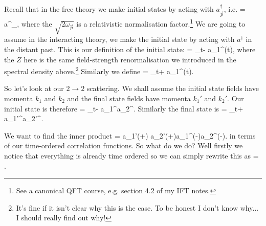 Recall that in the free theory we make initial states by acting with $a^{\dagger}_{\vec{p}}$, i.e. 
\bse 
     =  \, a^{\dagger}_{},
\ese
where the $\sqrt{2\omega_{\vec{p}}}$ is a relativistic normalisation factor.\footnote{See a canonical QFT course, e.g. section 4.2 of my IFT notes.} We are going to assume in the interacting theory, we make the initial state by acting with $a^{\dagger}$ in the distant past. This is our definition of the initial state: 
\bse 
     =  \lim_{t\to-\infty} a_1^{\dagger}(t)\ket{\Omega},
\ese 
where the $Z$ here is the same field-strength renormalisation we introduced in the spectral density above.\footnote{It's fine if it isn't clear why this is the case. To be honest I don't know why... I should really find out why!} Similarly we define \bse 
     =  \lim_{t\to+\infty} a_1^{\dagger}(t)\ket{\Omega}.
\ese

So let's look at our $2\to2$ scattering. We shall assume the initial state fields have momenta $k_1$ and $k_2$ and the final state fields have momenta $k_1'$ and $k_2'$. Our initial state is therefore 
\bse 
     =  \lim_{t\to-\infty} a_1^{\dagger}a_2^{\dagger}\ket{\Omega}.
\ese 
Similarly the final state is 
\bse 
     =  \lim_{t\to+\infty} a_{1'}^{\dagger}a_{2'}^{\dagger}\ket{\Omega}.
\ese 

We want to find the inner product
\bse 
     =  \bra{\Omega} a_{1'}(+\infty) a_{2'}(+\infty)a_1^{\dagger}(-\infty)a_2^{\dagger}(-\infty)\ket{\Omega}.
\ese 
in terms of our time-ordered correlation functions. So what do we do? Well firstly we notice that everything is already time ordered so we can simply rewrite this as
\bse 
     =  \bra{\Omega} \ket{\Omega}.
\ese 


